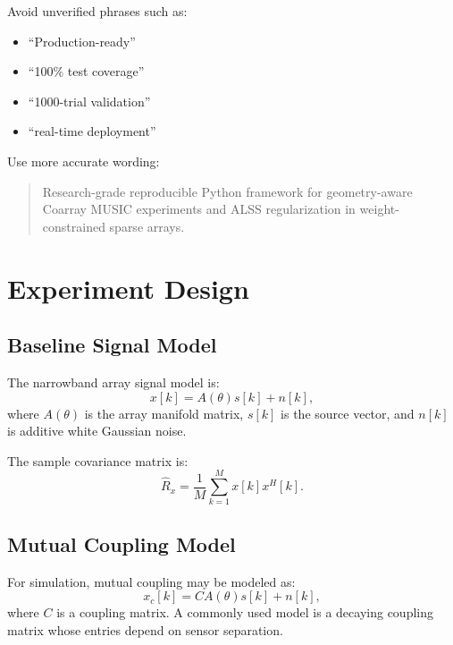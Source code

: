 \documentclass[11pt,letterpaper]{article}
\begin{document}
Avoid unverified phrases such as:
\begin{itemize}[leftmargin=*]
    \item ``Production-ready''
    \item ``100\% test coverage''
    \item ``1000-trial validation''
    \item ``real-time deployment''
\end{itemize}

Use more accurate wording:

\begin{quote}
Research-grade reproducible Python framework for geometry-aware Coarray MUSIC experiments and ALSS regularization in weight-constrained sparse arrays.
\end{quote}

\section{Experiment Design}

\subsection{Baseline Signal Model}

The narrowband array signal model is:
\begin{equation}
    x[k] = A(\theta)s[k] + n[k],
\end{equation}
where $A(\theta)$ is the array manifold matrix, $s[k]$ is the source vector, and $n[k]$ is additive white Gaussian noise.

The sample covariance matrix is:
\begin{equation}
    \hat{R}_x = \frac{1}{M}\sum_{k=1}^{M}x[k]x^H[k].
\end{equation}

\subsection{Mutual Coupling Model}

For simulation, mutual coupling may be modeled as:
\begin{equation}
    x_c[k] = C A(\theta)s[k] + n[k],
\end{equation}
where $C$ is a coupling matrix. A commonly used model is a decaying coupling matrix whose entries depend on sensor separation.
\end{document}
